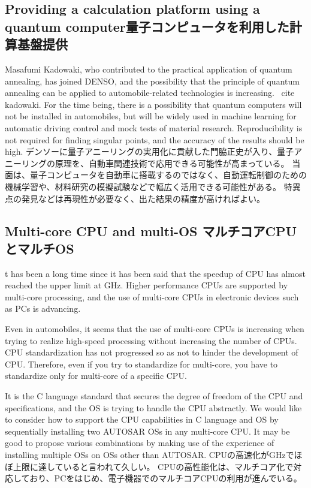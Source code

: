 \documentclass[twocolumn]{article} %
\begin{document}
\subsection{Providing a calculation platform using a quantum computer量子コンピュータを利用した計算基盤提供}
Masafumi Kadowaki, who contributed to the practical application of quantum annealing, has joined DENSO, and the possibility that the principle of quantum annealing can be applied to automobile-related technologies is increasing. \ cite {kadowaki}.
For the time being, there is a possibility that quantum computers will not be installed in automobiles, but will be widely used in machine learning for automatic driving control and mock tests of material research.
Reproducibility is not required for finding singular points, and the accuracy of the results should be high.
デンソーに量子アニーリングの実用化に貢献した門脇正史が入り、量子アニーリングの原理を、自動車関連技術で応用できる可能性が高まっている\cite{kadowaki}。
当面は、量子コンピュータを自動車に搭載するのではなく、自動運転制御のための機械学習や、材料研究の模擬試験などで幅広く活用できる可能性がある。
特異点の発見などは再現性が必要なく、出た結果の精度が高ければよい。

\subsection{Multi-core CPU and multi-OS マルチコアCPUとマルチOS}
t has been a long time since it has been said that the speedup of CPU has almost reached the upper limit at GHz.
Higher performance CPUs are supported by multi-core processing, and the use of multi-core CPUs in electronic devices such as PCs is advancing.

Even in automobiles, it seems that the use of multi-core CPUs is increasing when trying to realize high-speed processing without increasing the number of CPUs.
CPU standardization has not progressed so as not to hinder the development of CPU. Therefore, even if you try to standardize for multi-core, you have to standardize only for multi-core of a specific CPU.

It is the C language standard that secures the degree of freedom of the CPU and specifications, and the OS is trying to handle the CPU abstractly.
We would like to consider how to support the CPU capabilities in C language and OS by sequentially installing two AUTOSAR OSs in any multi-core CPU.
It may be good to propose various combinations by making use of the experience of installing multiple OSs on OSs other than AUTOSAR.
CPUの高速化がGHzでほぼ上限に達していると言われて久しい。
CPUの高性能化は、マルチコア化で対応しており、PCをはじめ、電子機器でのマルチコアCPUの利用が進んでいる。
\end{document}
